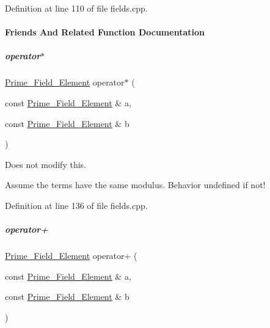 Definition at line 110 of file fields.\+cpp.



\paragraph{Friends And Related Function Documentation}
\mbox{\label{group___fields_group_a33507738ef00abb43ae64c900f7b807a}} 
\subparagraph{\texorpdfstring{operator$\ast$}{operator*}}
{\footnotesize\ttfamily \hyperlink{group___fields_group_class_prime___field___element}{Prime\+\_\+\+Field\+\_\+\+Element} operator$\ast$ (\begin{DoxyParamCaption}\item[{const \hyperlink{group___fields_group_class_prime___field___element}{Prime\+\_\+\+Field\+\_\+\+Element} \&}]{a,  }\item[{const \hyperlink{group___fields_group_class_prime___field___element}{Prime\+\_\+\+Field\+\_\+\+Element} \&}]{b }\end{DoxyParamCaption})\hspace{0.3cm}{\ttfamily [friend]}}



Does not modify {\ttfamily this}. 

Assume the terms have the same modulus. Behavior undefined if not! 

Definition at line 136 of file fields.\+cpp.

\mbox{\label{group___fields_group_af379d31756ccc09650e204aaa7dc1dd2}} 
\subparagraph{\texorpdfstring{operator+}{operator+}}
{\footnotesize\ttfamily \hyperlink{group___fields_group_class_prime___field___element}{Prime\+\_\+\+Field\+\_\+\+Element} operator+ (\begin{DoxyParamCaption}\item[{const \hyperlink{group___fields_group_class_prime___field___element}{Prime\+\_\+\+Field\+\_\+\+Element} \&}]{a,  }\item[{const \hyperlink{group___fields_group_class_prime___field___element}{Prime\+\_\+\+Field\+\_\+\+Element} \&}]{b }\end{DoxyParamCaption})\hspace{0.3cm}{\ttfamily [friend]}}



